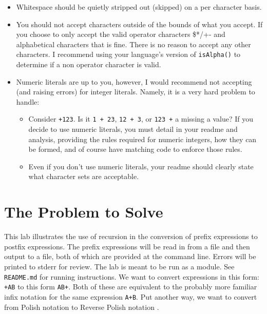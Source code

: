 \documentclass[10pt,letterpaper,final]{report}
\begin{document}
\begin{itemize}
  \item Whitespace should be quietly stripped out (skipped) on a per character basis.
  \item You should not accept characters outside of the bounds of what you accept. If you choose to only accept the valid operator characters \$*/+- and alphabetical characters that is fine. There is no reason to accept any other characters. I recommend using your language's version of \texttt{isAlpha()} to determine if a non operator character is valid.
  \item Numeric literals are up to you, however, I would recommend not accepting (and raising errors) for integer literals. Namely, it is a very hard problem to handle:
        \begin{itemize}
          \item Consider \texttt{+123}. Is it \texttt{1 + 23}, \texttt{12 + 3}, or \texttt{123 +} a missing a value? If you decide to use numeric literals, you must detail in your readme and analysis, providing the rules required for numeric integers, how they can be formed, and of course have matching code to enforce those rules.
          \item Even if you don't use numeric literals, your readme should clearly state what character sets are acceptable.
        \end{itemize}
\end{itemize}

\tableofcontents

\pagebreak

\section{The Problem to Solve}

This lab illustrates the use of recursion in the conversion of prefix expressions to postfix expressions. The prefix expressions will be read in from a file and then output to a file, both of which are provided at the command line. Errors will be printed to stderr for review. The lab is meant to be run as a module. See \texttt{README.md} for running instructions.
We want to convert expressions in this form: \texttt{+AB} to this form \texttt{AB+}. Both of these are equivalent to the probably more familiar infix notation for the same expression \texttt{A+B}. Put another way, we want to convert from Polish notation to Reverse Polish notation \parencite{EnWikipediaorgReversePolishNotation}.
\end{document}
